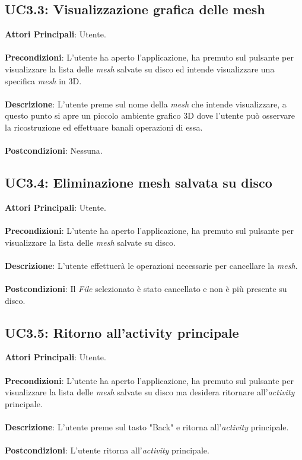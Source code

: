 \subsection{UC3.3: Visualizzazione grafica delle mesh}
\textbf{Attori Principali}: Utente.
\\\\ \textbf{Precondizioni}: L'utente ha aperto l'applicazione, ha premuto sul pulsante per visualizzare la lista delle \emph{mesh} salvate su disco ed intende visualizzare una specifica \emph{mesh} in 3D.
\\\\ \textbf{Descrizione}: L'utente preme sul nome della \emph{mesh} che intende visualizzare, a questo punto si apre un piccolo ambiente grafico 3D dove l'utente può osservare la ricostruzione ed effettuare banali operazioni di essa.
\\\\ \textbf{Postcondizioni}: Nessuna.

\subsection{UC3.4: Eliminazione mesh salvata su disco}
\textbf{Attori Principali}: Utente.
\\\\ \textbf{Precondizioni}: L'utente ha aperto l'applicazione, ha premuto sul pulsante per visualizzare la lista delle \emph{mesh} salvate su disco.
\\\\ \textbf{Descrizione}: L'utente effettuerà le operazioni necessarie per cancellare la \emph{mesh}.
\\\\ \textbf{Postcondizioni}: Il \emph{File} selezionato è stato cancellato e non è più presente su disco.

\subsection{UC3.5: Ritorno all'activity principale}
\textbf{Attori Principali}: Utente.
\\\\ \textbf{Precondizioni}: L'utente ha aperto l'applicazione, ha premuto sul pulsante per visualizzare la lista delle \emph{mesh} salvate su disco ma desidera ritornare all'\emph{activity} principale.
\\\\ \textbf{Descrizione}: L'utente preme sul tasto "Back" e ritorna all'\emph{activity} principale.
\\\\ \textbf{Postcondizioni}: L'utente ritorna all'\emph{activity} principale.


